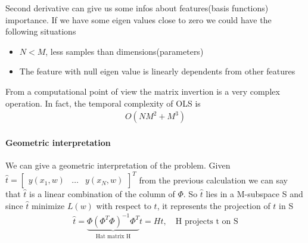 \documentclass[../main.tex]{subfiles}
\begin{document}
Second derivative can give us some infos about features(basis functions) importance. If we have some eigen values close to zero we could have the following situations
\begin{itemize}
    \item $N<M$, less samples than dimensions(parameters)
    \item The feature with null eigen value is linearly dependents from other features
\end{itemize}
From a computational point of view the matrix invertion is a very complex operation. In fact, the temporal complexity of OLS is
\begin{align*}
    O(NM^2+M^3)
\end{align*}

\newpage
\paragraph{Geometric interpretation}
We can give a geometric interpretation of the problem. Given $\hat{t}=\begin{bmatrix}y(x_1,w) & \dots & y(x_N,w)\end{bmatrix}^T$ from the previous calculation we can say that $\hat{t}$ is a linear combination of the column of $\Phi$. So $\hat{t}$ lies in a M-subspace S and since $\hat{t}$ minimize $L(w)$ with respect to $t$, it represents the projection of $t$ in S
\begin{align*}
    \hat{t}=\underbrace{\Phi(\Phi^T\Phi)^{-1}\Phi^T}_{\text{Hat matrix H}}t=Ht, \quad \text{H projects t on S}
\end{align*}
\end{document}
